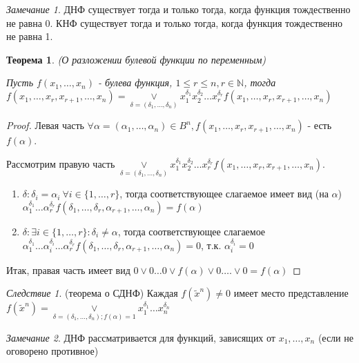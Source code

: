 \documentclass[final]{report}
\newtheorem* {theor} {Теорема}
\theoremstyle {remark}
\newtheorem* {remark} {Замечание}
\theoremstyle {remark}
\newtheorem* {sled} {Следствие}
\begin{document}
\begin{remark}
ДНФ существует тогда и только тогда, когда функция тождественно не равна 0. КНФ существует тогда и только тогда, когда функция тождественно не равна 1.
\end{remark}

\begin{theor} (О разложении булевой функции по переменным)

Пусть $f(x_1,\ldots,x_n)$ - булева функция, $1\leq r \leq n, r\in \mathbb{N}$, тогда $f(x_1,\ldots,x_r,x_{r+1},\ldots,x_n) = \underset {\delta=(\delta_1,\ldots,\delta_n)}{\lor} x_{1}^{\delta_1}x_{2}^{\delta_2}\ldots x_{r}^{\delta_r} f(x_1,\ldots,x_r,x_{r+1},\ldots,x_n)$
\end{theor}
\begin{proof}
Левая часть $\forall \alpha=(\alpha_1,\ldots,\alpha_n) \in B^n, f(x_1,\ldots,x_r,x_{r+1},\ldots,x_n)$ - есть $f(\alpha)$.

Рассмотрим правую часть $\underset {\delta=(\delta_1,\ldots,\delta_n)}{\lor} x_{1}^{\delta_1}x_{2}^{\delta_2}\ldots x_{r}^{\delta_r} f(x_1,\ldots,x_r,x_{r+1},\ldots,x_n)$. \begin{enumerate}
\item $\delta: \delta_i=\alpha_i \ \forall i \in \{1,\ldots,r\}$, тогда соответствующее слагаемое имеет вид (на $\alpha$) $\alpha_{1}^{\delta_1}\ldots\alpha_{r}^{\delta_r}f(\delta_1,\ldots,\delta_r,\alpha_{r+1},\ldots,\alpha_n) = f(\alpha)$
\item $\delta\colon\exists i \in \{1,\ldots,r\} : \delta_i \not= \alpha$, тогда соответствующее слагаемое $ \alpha_{1}^{\delta_1}\ldots\alpha_{i}^{\delta_i}\ldots\alpha_{r}^{\delta_r}f(\delta_1,\ldots,\delta_r,\alpha_{r+1},\ldots,\alpha_n) =0$, т.к. $\alpha_{i}^{\delta_i}=0 $
\end{enumerate}
Итак, правая часть имеет вид $0 \lor 0\ldots0 \lor f(\alpha) \lor 0\ldots.\lor 0=f(\alpha)$
\end{proof}

\begin{sled}
(теорема о СДНФ) Каждая $f(\tilde{x}^n) \not= 0$ имеет место представление $ f(\tilde{x}^n)= \underset {\delta=(\delta_1,\ldots,\delta_n); f(\alpha)=1}{\lor} x_{1}^{\delta_1}\ldots x_{n}^{\delta_n}$
\end{sled}

\begin{remark}
ДНФ рассматривается для функций, зависящих от $x_1,\ldots,x_n$ (если не оговорено противное) 
\end{remark}
\end{document}
